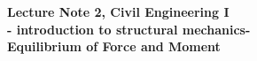 \documentclass[10pt,a4j]{article}
\newlength{\minitwocolumn}
\begin{document}
\newcommand{\fat}[1]{\mbox{\boldmath $#1$}}
\newcommand{\D}{\partial}
\newcommand{\w}{\omega}
\newcommand{\ga}{\alpha}
\newcommand{\gb}{\beta}
\newcommand{\gx}{\xi}
\newcommand{\gz}{\zeta}
\newcommand{\vhat}[1]{\hat{\fat{#1}}}
\newcommand{\spc}{\vspace{0.7\baselineskip}}
\newcommand{\halfspc}{\vspace{0.3\baselineskip}}

\newcommand{\twofig}[2]
 {
   \begin{figure}
     \begin{minipage}[t]{\minitwocolumn}
         \begin{center}   #1
         \end{center}
     \end{minipage}
         \hspace{\columnsep}
     \begin{minipage}[t]{\minitwocolumn}
         \begin{center} #2
         \end{center}
     \end{minipage}
   \end{figure}
 }
\begin{center}
	{\Large \bf Lecture Note 2, Civil Engineering I \\
	- introduction to structural mechanics-\\
	Equilibrium of Force and Moment
	}  \\
\end{center}
\vspace{1.5cm}
\end{document}
